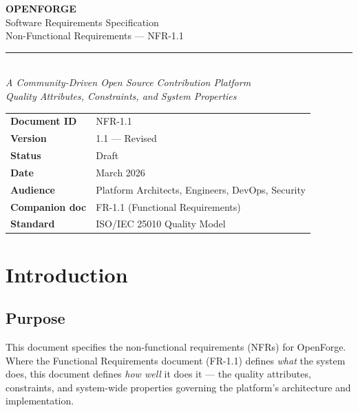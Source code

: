 \documentclass[12pt,a4paper]{article}
\begin{document}
\thispagestyle{empty}
\begin{center}
  \vspace*{3cm}
  {\fontsize{42}{50}\selectfont\bfseries\color{ofblue} OPENFORGE}\\[0.6em]
  {\Large\color{ofaccent} Software Requirements Specification}\\[0.3em]
  {\large\color{ofaccent} Non-Functional Requirements --- NFR-1.1}\\[1.5em]
  \color{ofrule}\rule{0.6\textwidth}{1.2pt}\\[1.5em]
  {\normalsize\itshape\color{ofgray}
    A Community-Driven Open Source Contribution Platform\\[0.3em]
    Quality Attributes, Constraints, and System Properties
  }\\[3cm]
  \begin{tabular}{L{3.5cm} L{8cm}}
    \textbf{\color{ofblue}Document ID}   & NFR-1.1 \\
    \textbf{\color{ofblue}Version}       & 1.1 --- Revised \\
    \textbf{\color{ofblue}Status}        & Draft \\
    \textbf{\color{ofblue}Date}          & March 2026 \\
    \textbf{\color{ofblue}Audience}      & Platform Architects, Engineers, DevOps, Security \\
    \textbf{\color{ofblue}Companion doc} & FR-1.1 (Functional Requirements) \\
    \textbf{\color{ofblue}Standard}      & ISO/IEC 25010 Quality Model \\
  \end{tabular}
\end{center}
\newpage

\tableofcontents
\newpage

\section{Introduction}

\subsection{Purpose}
This document specifies the non-functional requirements (NFRs) for OpenForge. Where the Functional Requirements document (FR-1.1) defines \emph{what} the system does, this document defines \emph{how well} it does it --- the quality attributes, constraints, and system-wide properties governing the platform's architecture and implementation.
\end{document}
